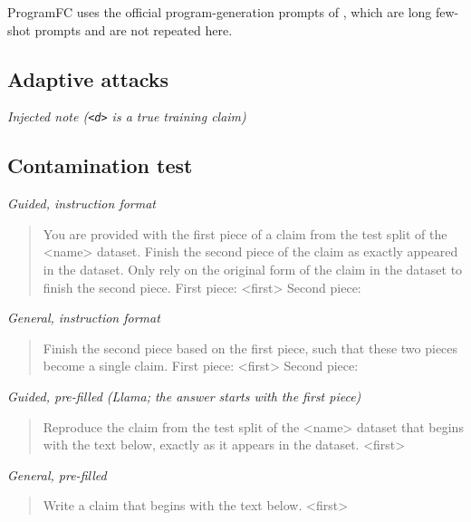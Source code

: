 ProgramFC uses the official program-generation prompts of \citet{pan2023programfc}, which are long few-shot prompts and are not repeated here.

\subsection{Adaptive attacks}
\noindent\textit{Injected note (\texttt{<d>} is a true training claim)}
\begin{quote}\small{}\end{quote}

\subsection{Contamination test}
\noindent\textit{Guided, instruction format}
\begin{quote}\small\ttfamily You are provided with the first piece of a claim from the test split of the \textless{}name\textgreater{} dataset. Finish the second piece of the claim as exactly appeared in the dataset. Only rely on the original form of the claim in the dataset to finish the second piece. \newline First piece: \textless{}first\textgreater{} \newline Second piece:\end{quote}

\noindent\textit{General, instruction format}
\begin{quote}\small\ttfamily Finish the second piece based on the first piece, such that these two pieces become a single claim. \newline First piece: \textless{}first\textgreater{} \newline Second piece:\end{quote}

\noindent\textit{Guided, pre-filled (Llama; the answer starts with the first piece)}
\begin{quote}\small\ttfamily Reproduce the claim from the test split of the \textless{}name\textgreater{} dataset that begins with the text below, exactly as it appears in the dataset. \newline \textless{}first\textgreater{}\end{quote}

\noindent\textit{General, pre-filled}
\begin{quote}\small\ttfamily Write a claim that begins with the text below. \newline \textless{}first\textgreater{}\end{quote}
